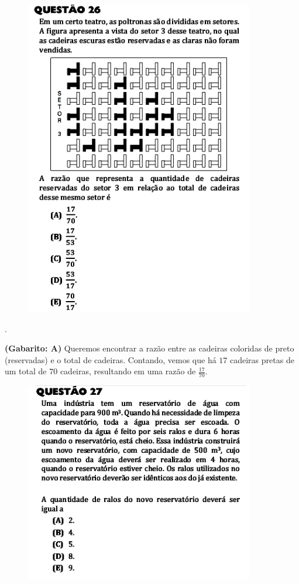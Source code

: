 \documentclass[a4paper]{article}
\begin{document}
\begin{figure}[H]
	\begin{center}
		\includegraphics[width=10cm]{L2Q26.png}
	\end{center}
\end{figure}.
\par\textbf{(Gabarito: A)} Queremos encontrar a razão entre as cadeiras coloridas de preto (reservadas) e o total de cadeiras. Contando, vemos que há $17$ cadeiras pretas de um total de $70$ cadeiras, resultando em uma razão de $\displaystyle{\frac{17}{70}}$.
\begin{figure}[H]
	\begin{center}
		\includegraphics[width=10cm]{L2Q27.png}
	\end{center}
\end{figure}
\end{document}
